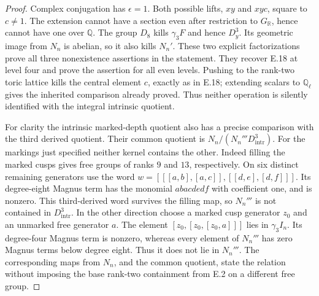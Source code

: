 \begin{proof}
Complex conjugation has $\epsilon=1$. Both possible lifts,
$xy$ and $xyc$, square to $c\ne1$.
The extension cannot have a section even after restriction to
$G_{\mathbb R}$, hence cannot have one over $\mathbb Q$.
The group $D_8$ kills $\gamma_3F$ and hence $D_y^3$.
Its geometric image from $N_n$ is abelian, so it also kills
$N_n'$. These two explicit factorizations prove all three
nonexistence assertions in the statement.
They recover E.18 at level four and prove the assertion for
all even levels. Pushing to the rank-two toric lattice kills
the central element $c$, exactly as in E.18; extending scalars
to $\mathbb Q_\ell$ gives the inherited comparison already proved.
Thus neither operation is silently identified with the integral
intrinsic quotient.

For clarity the intrinsic marked-depth quotient also has a
precise comparison with the third derived quotient. Their common
quotient is
$N_n/(N_n'''D_{\mathrm{intr}}^3)$.
For the markings just specified neither kernel contains the other.
Indeed filling the marked cusps gives free groups of ranks
$9$ and $13$, respectively. On six distinct remaining generators
use the word
$w=[[[a,b],[a,c]],[[d,e],[d,f]]]$.
Its degree-eight Magnus term has the monomial $abacdedf$ with
coefficient one, and is nonzero. This third-derived word survives
the filling map,
so $N_n'''$ is not contained in $D_{\mathrm{intr}}^3$.
In the other direction choose a marked cusp generator $z_0$
and an unmarked free generator $a$. The element
$[z_0,[z_0,[z_0,a]]]$ lies in $\gamma_3 I_n$.
Its degree-four Magnus term is nonzero, whereas every element
of $N_n'''$ has zero Magnus terms below degree eight.
Thus it does not lie in $N_n'''$.
The corresponding maps from $N_n$, and the common quotient,
state the relation without imposing the base rank-two
containment from E.2 on a different free group.
\end{proof}
